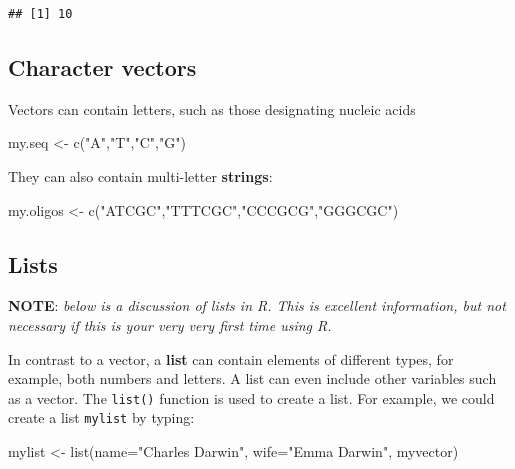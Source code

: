 \documentclass[
]{book}
\newenvironment{Shaded}{\begin{snugshade}}{\end{snugshade}}
\newcommand{\AttributeTok}[1]{\textcolor[rgb]{0.77,0.63,0.00}{#1}}
\newcommand{\FunctionTok}[1]{\textcolor[rgb]{0.00,0.00,0.00}{#1}}
\newcommand{\NormalTok}[1]{#1}
\newcommand{\OtherTok}[1]{\textcolor[rgb]{0.56,0.35,0.01}{#1}}
\newcommand{\StringTok}[1]{\textcolor[rgb]{0.31,0.60,0.02}{#1}}
\begin{document}
\begin{verbatim}
## [1] 10
\end{verbatim}

\hypertarget{character-vectors}{%
\subsection{Character vectors}\label{character-vectors}}

Vectors can contain letters, such as those designating nucleic acids

\begin{Shaded}
\begin{Highlighting}[]
\NormalTok{my.seq }\OtherTok{\textless{}{-}} \FunctionTok{c}\NormalTok{(}\StringTok{"A"}\NormalTok{,}\StringTok{"T"}\NormalTok{,}\StringTok{"C"}\NormalTok{,}\StringTok{"G"}\NormalTok{)}
\end{Highlighting}
\end{Shaded}

They can also contain multi-letter \textbf{strings}:

\begin{Shaded}
\begin{Highlighting}[]
\NormalTok{my.oligos }\OtherTok{\textless{}{-}} \FunctionTok{c}\NormalTok{(}\StringTok{"ATCGC"}\NormalTok{,}\StringTok{"TTTCGC"}\NormalTok{,}\StringTok{"CCCGCG"}\NormalTok{,}\StringTok{"GGGCGC"}\NormalTok{)}
\end{Highlighting}
\end{Shaded}

\hypertarget{lists}{%
\subsection{Lists}\label{lists}}

\textbf{NOTE}: \emph{below is a discussion of lists in R. This is excellent information, but not necessary if this is your very very first time using R.}

In contrast to a vector, a \textbf{list} can contain elements of different types, for example, both numbers and letters. A list can even include other variables such as a vector. The \texttt{list()} function is used to create a list. For example, we could create a list \texttt{mylist} by typing:

\begin{Shaded}
\begin{Highlighting}[]
\NormalTok{mylist }\OtherTok{\textless{}{-}} \FunctionTok{list}\NormalTok{(}\AttributeTok{name=}\StringTok{"Charles Darwin"}\NormalTok{, }
               \AttributeTok{wife=}\StringTok{"Emma Darwin"}\NormalTok{, }
\NormalTok{               myvector)}
\end{Highlighting}
\end{Shaded}
\end{document}
